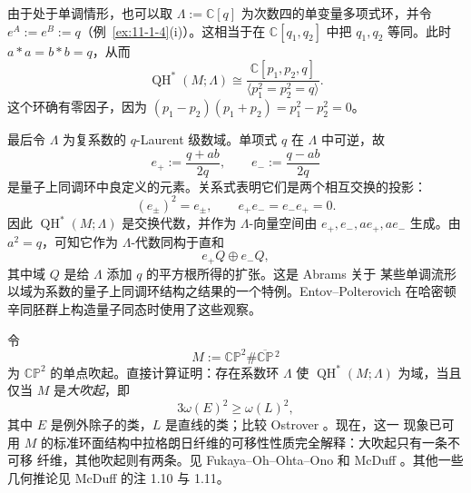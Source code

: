 \begin{example}
由于处于单调情形，也可以取 $\Lambda:=\mathbb C[q]$ 为次数四的单变量多项式环，并令
$e^A:=e^B:=q$（例~\ref{ex:11-1-4}(i)）。这相当于在 $\mathbb C[q_1,q_2]$ 中把
$q_1,q_2$ 等同。此时 $a*a=b*b=q$，从而
\[
  \operatorname{QH}^*(M;\Lambda)\cong
  \frac{\mathbb C[p_1,p_2,q]}
       {\langle p_1^2=p_2^2=q\rangle}.
\]
这个环确有零因子，因为
$(p_1-p_2)(p_1+p_2)=p_1^2-p_2^2=0$。

最后令 $\Lambda$ 为复系数的 $q$-Laurent 级数域。单项式 $q$ 在 $\Lambda$ 中可逆，故
\[
  e_+:=\frac{q+ab}{2q},\qquad e_-:=\frac{q-ab}{2q}
\]
是量子上同调环中良定义的元素。关系式表明它们是两个相互交换的投影：
\[
  (e_\pm)^2=e_\pm,\qquad e_+e_-=e_-e_+=0.
\]
因此 $\operatorname{QH}^*(M;\Lambda)$ 是交换代数，并作为 $\Lambda$-向量空间由
$e_+,e_-,ae_+,ae_-$ 生成。由 $a^2=q$，可知它作为 $\Lambda$-代数同构于直和
\[
  e_+Q\oplus e_-Q,
\]
其中域 $Q$ 是给 $\Lambda$ 添加 $q$ 的平方根所得的扩张。这是 Abrams  关于
某些单调流形以域为系数的量子上同调环结构之结果的一个特例。Entov--Polterovich
 在哈密顿辛同胚群上构造量子同态时使用了这些观察。
\end{example}

\begin{exercise}\label{ex:11-1-14}
令
\[
  M:=\mathbb{CP}^2\#\overline{\mathbb{CP}}{}^{\,2}
\]
为 $\mathbb{CP}^2$ 的单点吹起。直接计算证明：存在系数环 $\Lambda$ 使
$\operatorname{QH}^*(M;\Lambda)$ 为域，当且仅当 $M$ 是\emph{大吹起}，即
\[
  3\omega(E)^2\ge\omega(L)^2,
\]
其中 $E$ 是例外除子的类，$L$ 是直线的类；比较 Ostrover 。现在，这一
现象已可用 $M$ 的标准环面结构中拉格朗日纤维的可移性性质完全解释：大吹起只有一条不可移
纤维，其他吹起则有两条。见 Fukaya--Oh--Ohta--Ono
 和 McDuff 。其他一些几何推论见 McDuff
 的注 1.10 与 1.11。
\end{exercise}

